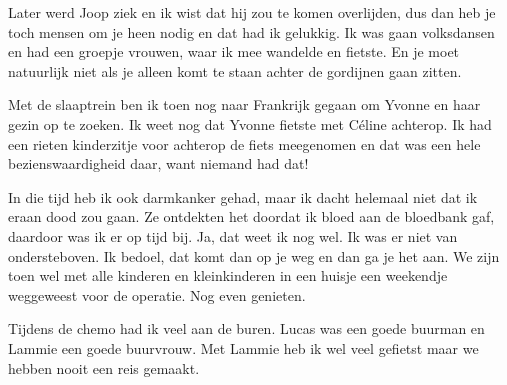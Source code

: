 Later werd Joop ziek en ik wist dat hij zou te komen overlijden, dus dan heb je toch mensen om je heen nodig en dat had ik gelukkig. Ik was gaan volksdansen en had een groepje vrouwen, waar ik mee wandelde en fietste. En je moet natuurlijk niet als je alleen komt te staan achter de gordijnen gaan zitten. 

Met de slaaptrein ben ik toen nog naar Frankrijk gegaan om Yvonne en haar gezin op te zoeken. Ik weet nog dat Yvonne fietste met C\'{e}line achterop. Ik had een rieten kinderzitje voor achterop de fiets meegenomen en dat was een hele bezienswaardigheid daar, want niemand had dat!

In die tijd heb ik ook darmkanker gehad, maar ik dacht helemaal niet dat ik eraan dood zou gaan. Ze ontdekten het doordat ik bloed aan de bloedbank gaf, daardoor was ik er op tijd bij. Ja, dat weet ik nog wel. Ik was er niet van ondersteboven. Ik bedoel, dat komt dan op je weg en dan ga je het aan. We zijn toen wel met alle kinderen en kleinkinderen in een huisje een weekendje weggeweest voor de operatie. Nog even genieten.

Tijdens de chemo had ik veel aan de buren. Lucas was een goede buurman en Lammie een goede buurvrouw. Met Lammie heb ik wel veel gefietst maar we hebben nooit een reis gemaakt.